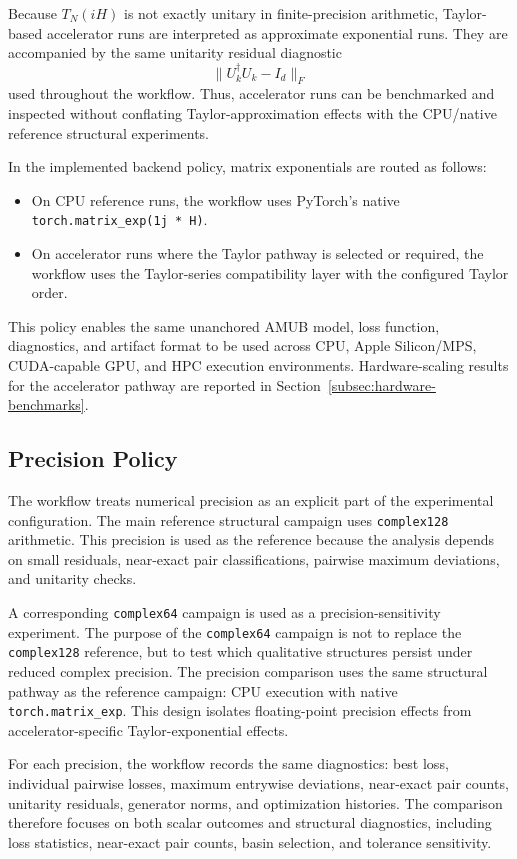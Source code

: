 \documentclass[a4paper,twocolumn,11pt,amsfonts,amssymb]{quantumarticle}
\begin{document}
Because \(T_N(iH)\) is not exactly unitary in finite-precision arithmetic, Taylor-based accelerator runs are interpreted as approximate exponential runs. They are accompanied by the same unitarity residual diagnostic
\[
    \|U_k^\dagger U_k - I_d\|_F
\]
used throughout the workflow. Thus, accelerator runs can be benchmarked and inspected without conflating Taylor-approximation effects with the CPU/native reference structural experiments.

In the implemented backend policy, matrix exponentials are routed as follows:
\begin{itemize}
    \item On CPU reference runs, the workflow uses PyTorch's native \texttt{torch.matrix\_exp(1j * H)}.
    \item On accelerator runs where the Taylor pathway is selected or required, the workflow uses the Taylor-series compatibility layer with the configured Taylor order.
\end{itemize}

This policy enables the same unanchored AMUB model, loss function, diagnostics, and artifact format to be used across CPU, Apple Silicon/MPS, CUDA-capable GPU, and HPC execution environments. Hardware-scaling results for the accelerator pathway are reported in Section~\ref{subsec:hardware-benchmarks}.

\subsection{Precision Policy}

The workflow treats numerical precision as an explicit part of the experimental configuration. The main reference structural campaign uses \texttt{complex128} arithmetic. This precision is used as the reference because the analysis depends on small residuals, near-exact pair classifications, pairwise maximum deviations, and unitarity checks.

A corresponding \texttt{complex64} campaign is used as a precision-sensitivity experiment. The purpose of the \texttt{complex64} campaign is not to replace the \texttt{complex128} reference, but to test which qualitative structures persist under reduced complex precision. The precision comparison uses the same structural pathway as the reference campaign: CPU execution with native \texttt{torch.matrix\_exp}. This design isolates floating-point precision effects from accelerator-specific Taylor-exponential effects.

For each precision, the workflow records the same diagnostics: best loss, individual pairwise losses, maximum entrywise deviations, near-exact pair counts, unitarity residuals, generator norms, and optimization histories. The comparison therefore focuses on both scalar outcomes and structural diagnostics, including loss statistics, near-exact pair counts, basin selection, and tolerance sensitivity.
\end{document}
